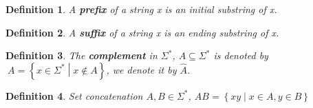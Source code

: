 \documentclass[a4paper]{article}
\newtheorem{definition}{Definition}
\begin{document}
\begin{definition}
    A \textbf{prefix} of a string x is an initial substring of x.
\end{definition}
\begin{definition}
    A \textbf{suffix} of a string x is an ending substring of x.
\end{definition}
\begin{definition}
    The \textbf{complement} in $\Sigma^*$, $A\subseteq\Sigma^*$ is denoted by
    $~A=\left\{ x\in\Sigma^* \middle| x\notin A \right\}$, we denote it by $\hat{A}$.
\end{definition}
\begin{definition}
    Set concatenation $A,B\in\Sigma^*$, $AB=\left\{ xy \middle | x\in A, y\in B \right\}$
\end{definition}
\end{document}
